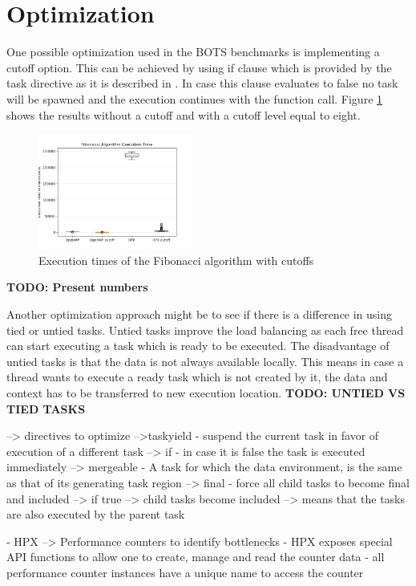\section{Optimization}
  One possible optimization used in the BOTS benchmarks is implementing a cutoff option.
  This can be achieved by using if clause which is provided by the task directive as it is described in \cite{LaGrone.2011}.
  In case this clause evaluates to false no task will be spawned and the execution continues with the function call.
  Figure \ref{fig:cutoff} shows the results without a cutoff and with a cutoff level equal to eight. 
\begin{figure}[htbp]
	\centering
	\includegraphics[width=0.45\textwidth]{figures/cutoff_plot.png}
	\caption{Execution times of the Fibonacci algorithm with cutoffs}
	\label{fig:cutoff}
\end{figure}
  \textbf{TODO: Present numbers}
 
   
  Another optimization approach might be to see if there is a difference in using tied or untied tasks.
  Untied tasks improve the load balancing as each free thread can start executing a task which is ready to be executed.
  The disadvantage of untied tasks is that the data is not always available locally.
  This means in case a thread wants to execute a ready task which is not created by it, the data and context has to be transferred to new execution location.
  \textbf{TODO: UNTIED VS TIED TASKS}	
	
		
    
    
    \cite{MKlemm.2018}
 --> directives to optimize
 	-->taskyield - suspend the current task in favor of execution of a different task
 	--> if - in case it is false the task is executed immediately
 	--> mergeable - A task for which the data environment, is the same as that of its generating task region
 	--> final - force all child tasks to become final and included
 		--> if true --> child tasks become included --> means that the tasks are also executed by the parent task

  \cite{TheSTEARGroup.2020}
    - HPX --> Performance counters to identify bottlenecks
    - HPX exposes special API functions to allow one to create, manage and read the counter data
    - all performance counter instances have a unique name to access the counter


